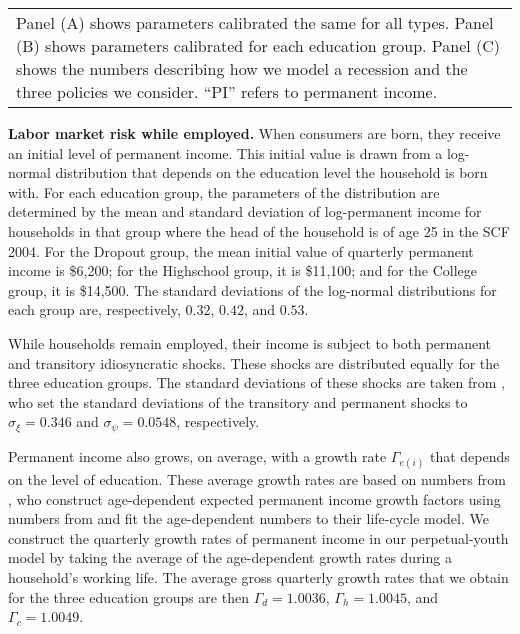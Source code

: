 \documentclass[\econtexRoot/HAFiscal]{subfiles}
\begin{document}
{\begin{table}[p]
\begin{tabular}{c}
      \end{tabular}
    \begin{tabular}{p{16cm}}
      \medskip
      \small Panel (A) shows parameters calibrated the same for all types. Panel (B) shows parameters calibrated for each education group. Panel (C) shows the numbers describing how we model a recession and the three policies we consider. ``PI'' refers to permanent income.
      \end{tabular}
    \notinsubfile{\label{tab:calibration}}
  \end{table}
  \clearpage
}

\textbf{Labor market risk while employed.} When consumers are born, they receive an initial level of permanent income.
This initial value is drawn from a log-normal distribution that depends on the education level the household is born with.
For each education group, the parameters of the distribution are determined by the mean and standard deviation of log-permanent income for households in that group where the head of the household is of age 25 in the SCF 2004.
For the Dropout group, the mean initial value of quarterly permanent income is \$6,200; for the Highschool group, it is \$11,100; and for the College group, it is \$14,500.
The standard deviations of the log-normal distributions for each group are, respectively, $0.32$, $0.42$, and $0.53$.


While households remain employed, their income is subject to both permanent and transitory idiosyncratic shocks.
These shocks are distributed equally for the three education groups.
The standard deviations of these shocks are taken from \cite{carroll2020sticky}, who set the standard deviations of the transitory and permanent shocks to $\sigma_\xi=0.346$ and $\sigma_\psi=0.0548$, respectively.


Permanent income also grows, on average, with a growth rate $\Gamma_{e(i)}$ that depends on the level of education.
These average growth rates are based on numbers from \cite{carroll2020modeling}, who construct age-dependent expected permanent income growth factors using numbers from \cite{cagetti2003wealth} and fit the age-dependent numbers to their life-cycle model.
We construct the quarterly growth rates of permanent income in our perpetual-youth model by taking the average of the age-dependent growth rates during a household's working life.
The average gross quarterly growth rates that we obtain for the three education groups are then $\Gamma_d=1.0036$, $\Gamma_h=1.0045$, and $\Gamma_c=1.0049$.
\end{document}
